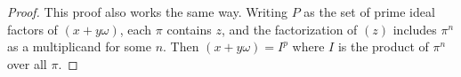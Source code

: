 \begin{proof}
    This proof also works the same way. Writing $P$ as the set of prime ideal factors of $(x+y\omega)$, each $\pi$ contains $z$, and the factorization of $(z)$ includes $\pi^n$ as a multiplicand for some $n$. Then $(x+y\omega) = I^p$ where $I$ is the product of $\pi^n$ over all $\pi$.
\end{proof}